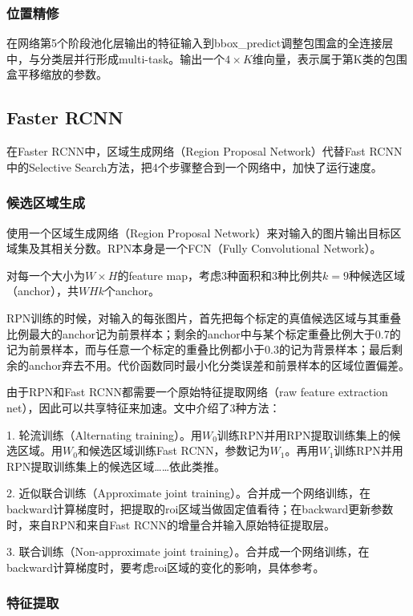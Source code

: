 \documentclass[a4paper, 12pt, UTF8]{article}
\begin{document}
\subsubsection{位置精修}

在网络第5个阶段池化层输出的特征输入到bbox\_predict调整包围盒的全连接层中，与分类层并行形成multi-task。输出一个$4 \times K$维向量，表示属于第K类的包围盒平移缩放的参数。


\subsection{Faster RCNN}

在Faster RCNN中，区域生成网络（Region Proposal Network）代替Fast RCNN中的Selective Search方法，把4个步骤整合到一个网络中，加快了运行速度。


\subsubsection{候选区域生成}

使用一个区域生成网络（Region Proposal Network）来对输入的图片输出目标区域集及其相关分数。RPN本身是一个FCN（Fully Convolutional Network）。

对每一个大小为$W \times H$的feature map，考虑3种面积和3种比例共$k = 9$种候选区域（anchor），共$WHk$个anchor。

RPN训练的时候，对输入的每张图片，首先把每个标定的真值候选区域与其重叠比例最大的anchor记为前景样本；剩余的anchor中与某个标定重叠比例大于0.7的记为前景样本，而与任意一个标定的重叠比例都小于0.3的记为背景样本；最后剩余的anchor弃去不用。代价函数同时最小化分类误差和前景样本的区域位置偏差。

由于RPN和Fast RCNN都需要一个原始特征提取网络（raw feature extraction net），因此可以共享特征来加速。文中介绍了3种方法：

1. 轮流训练（Alternating training）。用$W_0$训练RPN并用RPN提取训练集上的候选区域。用$W_0$和候选区域训练Fast RCNN，参数记为$W_1$。再用$W_1$训练RPN并用RPN提取训练集上的候选区域……依此类推。

2. 近似联合训练（Approximate joint training）。合并成一个网络训练，在backward计算梯度时，把提取的roi区域当做固定值看待；在backward更新参数时，来自RPN和来自Fast RCNN的增量合并输入原始特征提取层。

3. 联合训练（Non-approximate joint training）。合并成一个网络训练，在backward计算梯度时，要考虑roi区域的变化的影响，具体参考\cite{ref10}。

\subsubsection{特征提取}
\end{document}
